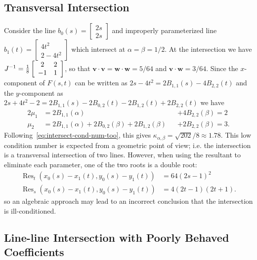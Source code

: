 \documentclass[3p, authoryear, square]{elsarticle}
\theoremstyle{definition}
\begin{document}
\subsection{Transversal Intersection}

Consider the line
\(b_0(s) = \left[ \begin{array}{c} 2s \\ 2s \end{array}\right]\)
and improperly parameterized line
\(b_1(t) = \left[ \begin{array}{c} 4t^2 \\ 2 - 4t^2
\end{array}\right]\) which intersect at \(\alpha = \beta = 1/2\).
At the intersection we have \(J^{-1} = \frac{1}{8}
\left[ \begin{array}{c c} 2 & 2 \\ -1 & 1 \end{array}\right]\),
so that \(\bm{v} \cdot \bm{v} = \bm{w} \cdot \bm{w} =
5/64\) and \(\bm{v} \cdot \bm{w} = 3/64\). Since the
\(x\)-component of \(F(s, t)\) can be written as
\(2s - 4t^2 = 2 B_{1, 1}(s) - 4 B_{2, 2}(t)\) and the
\(y\)-component as \(2s + 4t^2 - 2 = 2 B_{1, 1}(s) - 2 B_{0, 2}(t)
- 2 B_{1, 2}(t) + 2 B_{2, 2}(t)\) we have
\begin{alignat}{2}
\mu_1 &= 2 B_{1, 1}(\alpha) &&+ 4 B_{2, 2}(\beta) = 2 \\
\mu_2 &= 2 B_{1, 1}(\alpha) + 2 B_{0, 2}(\beta) +
  2 B_{1, 2}(\beta) &&+ 2 B_{2, 2}(\beta) = 3.
\end{alignat}
Following~\eqref{eq:intersect-cond-num-too}, this gives
\(\kappa_{\alpha, \beta} = \sqrt{202}/8 \approx 1.78\).
This low condition number is expected from a geometric point of view; i.e.
the intersection is a transversal intersection of two lines. However,
when using the resultant to eliminate each parameter, one of the two roots is
a double root:
\begin{align}
\operatorname{Res}_t\left(x_0(s) - x_1(t), y_0(s) - y_1(t)\right) &=
  64(2s - 1)^2 \\
\operatorname{Res}_s\left(x_0(s) - x_1(t), y_0(s) - y_1(t)\right) &=
  4(2t - 1)(2t + 1).
\end{align}
so an algebraic approach may lead to an incorrect conclusion that the
intersection is ill-conditioned.

\subsection{Line-line Intersection with Poorly Behaved Coefficients}
\end{document}
